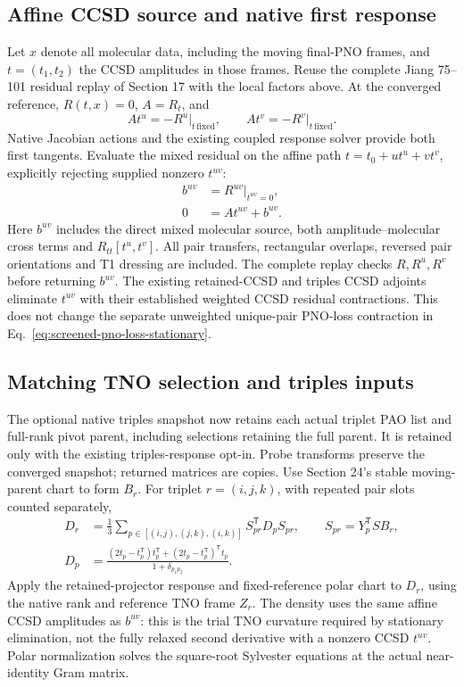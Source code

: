 \documentclass[11pt]{article}
\begin{document}
\subsection{Affine CCSD source and native first response}
Let $x$ denote all molecular data, including the moving final-PNO frames,
and $t=(t_1,t_2)$ the CCSD amplitudes in those frames. Reuse the complete
Jiang 75--101 residual replay of Section 17 with the local factors above.
At the converged reference, $R(t,x)=0$, $A=R_t$, and
\begin{equation}
 At^u=-R^u\big|_{t\,\mathrm{fixed}},\qquad
 At^v=-R^v\big|_{t\,\mathrm{fixed}}.
\end{equation}
Native Jacobian actions and the existing coupled response solver provide
both first tangents. Evaluate the mixed residual on the affine path
$t=t_0+u t^u+v t^v$, explicitly rejecting supplied nonzero $t^{uv}$:
\begin{align}
 b^{uv}&=R^{uv}\big|_{t^{uv}=0},\\
 0&=At^{uv}+b^{uv}.
\end{align}
Here $b^{uv}$ includes the direct mixed molecular source, both
amplitude--molecular cross terms and $R_{tt}[t^u,t^v]$. All pair transfers,
rectangular overlaps, reversed pair orientations and T1 dressing are
included. The complete replay checks $R,R^u,R^v$ before returning $b^{uv}$.
The existing retained-CCSD and triples CCSD adjoints eliminate $t^{uv}$
with their established weighted CCSD residual contractions. This does not
change the separate unweighted unique-pair PNO-loss contraction in
Eq.~\eqref{eq:screened-pno-loss-stationary}.

\subsection{Matching TNO selection and triples inputs}
The optional native triples snapshot now retains each actual triplet PAO
list and full-rank pivot parent, including selections retaining the full
parent. It is retained only with the existing triples-response opt-in.
Probe transforms preserve the converged snapshot; returned matrices are
copies. Use Section 24's stable moving-parent chart to form $B_r$.
For triplet $r=(i,j,k)$, with repeated pair slots counted separately,
\begin{align}
 D_r&=\frac13\sum_{p\in[(i,j),(j,k),(i,k)]}
             S_{pr}^{\mathsf T}D_pS_{pr},\qquad S_{pr}=Y_p^{\mathsf T}SB_r,\\
 D_p&=\frac{(2t_p-t_p^{\mathsf T})t_p^{\mathsf T}
                  +(2t_p-t_p^{\mathsf T})^{\mathsf T}t_p}{1+\delta_{p_1p_2}}.
\end{align}
Apply the retained-projector response and fixed-reference polar chart to
$D_r$, using the native rank and reference TNO frame $Z_r$. The density
uses the same affine CCSD amplitudes as $b^{uv}$: this is the trial TNO
curvature required by stationary elimination, not the fully relaxed
second derivative with a nonzero CCSD $t^{uv}$. Polar normalization solves
the square-root Sylvester equations at the actual near-identity Gram matrix.
\end{document}
